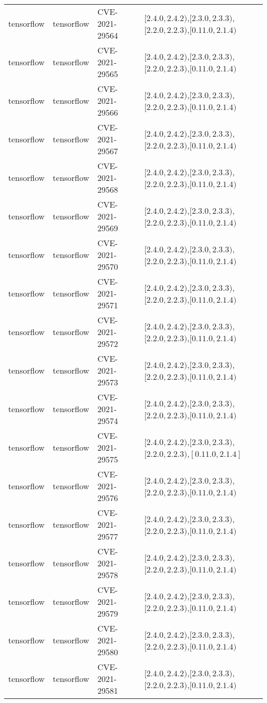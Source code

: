 \begin{tabular}{llll}
tensorflow & tensorflow & CVE-2021-29564 & $[2.4.0,2.4.2)$,$[2.3.0,2.3.3)$,$[2.2.0,2.2.3)$,$[0.11.0,2.1.4)$ \\
tensorflow & tensorflow & CVE-2021-29565 & $[2.4.0,2.4.2)$,$[2.3.0,2.3.3)$,$[2.2.0,2.2.3)$,$[0.11.0,2.1.4)$ \\
tensorflow & tensorflow & CVE-2021-29566 & $[2.4.0,2.4.2)$,$[2.3.0,2.3.3)$,$[2.2.0,2.2.3)$,$[0.11.0,2.1.4)$ \\
tensorflow & tensorflow & CVE-2021-29567 & $[2.4.0,2.4.2)$,$[2.3.0,2.3.3)$,$[2.2.0,2.2.3)$,$[0.11.0,2.1.4)$ \\
tensorflow & tensorflow & CVE-2021-29568 & $[2.4.0,2.4.2)$,$[2.3.0,2.3.3)$,$[2.2.0,2.2.3)$,$[0.11.0,2.1.4)$ \\
tensorflow & tensorflow & CVE-2021-29569 & $[2.4.0,2.4.2)$,$[2.3.0,2.3.3)$,$[2.2.0,2.2.3)$,$[0.11.0,2.1.4)$ \\
tensorflow & tensorflow & CVE-2021-29570 & $[2.4.0,2.4.2)$,$[2.3.0,2.3.3)$,$[2.2.0,2.2.3)$,$[0.11.0,2.1.4)$ \\
tensorflow & tensorflow & CVE-2021-29571 & $[2.4.0,2.4.2)$,$[2.3.0,2.3.3)$,$[2.2.0,2.2.3)$,$[0.11.0,2.1.4)$ \\
tensorflow & tensorflow & CVE-2021-29572 & $[2.4.0,2.4.2)$,$[2.3.0,2.3.3)$,$[2.2.0,2.2.3)$,$[0.11.0,2.1.4)$ \\
tensorflow & tensorflow & CVE-2021-29573 & $[2.4.0,2.4.2)$,$[2.3.0,2.3.3)$,$[2.2.0,2.2.3)$,$[0.11.0,2.1.4)$ \\
tensorflow & tensorflow & CVE-2021-29574 & $[2.4.0,2.4.2)$,$[2.3.0,2.3.3)$,$[2.2.0,2.2.3)$,$[0.11.0,2.1.4)$ \\
tensorflow & tensorflow & CVE-2021-29575 & $[2.4.0,2.4.2)$,$[2.3.0,2.3.3)$,$[2.2.0,2.2.3)$,$[0.11.0,2.1.4]$ \\
tensorflow & tensorflow & CVE-2021-29576 & $[2.4.0,2.4.2)$,$[2.3.0,2.3.3)$,$[2.2.0,2.2.3)$,$[0.11.0,2.1.4)$ \\
tensorflow & tensorflow & CVE-2021-29577 & $[2.4.0,2.4.2)$,$[2.3.0,2.3.3)$,$[2.2.0,2.2.3)$,$[0.11.0,2.1.4)$ \\
tensorflow & tensorflow & CVE-2021-29578 & $[2.4.0,2.4.2)$,$[2.3.0,2.3.3)$,$[2.2.0,2.2.3)$,$[0.11.0,2.1.4)$ \\
tensorflow & tensorflow & CVE-2021-29579 & $[2.4.0,2.4.2)$,$[2.3.0,2.3.3)$,$[2.2.0,2.2.3)$,$[0.11.0,2.1.4)$ \\
tensorflow & tensorflow & CVE-2021-29580 & $[2.4.0,2.4.2)$,$[2.3.0,2.3.3)$,$[2.2.0,2.2.3)$,$[0.11.0,2.1.4)$ \\
tensorflow & tensorflow & CVE-2021-29581 & $[2.4.0,2.4.2)$,$[2.3.0,2.3.3)$,$[2.2.0,2.2.3)$,$[0.11.0,2.1.4)$ \\

\end{tabular}
